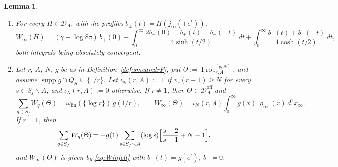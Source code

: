 \documentclass[11pt]{amsart}
\newtheorem{lemma}[theorem]{Lemma}
\theoremstyle{definition}
\newcommand{\Frob}{\operatorname{Frob}}
\newcommand{\supp}{\operatorname{supp}}
\newcommand{\DA}{\mathcal D_A}
\newcommand{\Doff}{\mathcal D_A^{\mathrm{off}}}
\begin{document}
\begin{lemma}\label{lem:boxtrace}
\begin{enumerate}
\item[(a)] For every $H\in\DA$, with the profiles
$b_\pm(t)=H(j_\infty(\pm e^t))$,
\begin{equation}\label{eq:Winfalt}
  W_\infty(H)=(\gamma+\log8\pi)\,b_+(0)
   -\int_0^\infty\frac{2b_+(0)-b_+(t)-b_+(-t)}{4\sinh(t/2)}\,dt
   +\int_0^\infty\frac{b_-(t)+b_-(-t)}{4\cosh(t/2)}\,dt ,
\end{equation}
both integrals being absolutely convergent.
\item[(b)] Let $r$, $A$, $N$, $g$ be as in
Definition~\ref{def:smearedrF}, put $\Theta:=\Frob_{r,A}^{[g,N]}$, and assume
$\supp g\cap Q_S\subseteq\{1/r\}$. Let $\iota_N(r,A):=1$ if $v_s(r-1)\ge N$
for every $s\in S_f\smallsetminus A$, and $\iota_N(r,A):=0$ otherwise. If
$r\ne1$, then $\Theta\in\Doff$ and
\begin{equation}\label{eq:boxoff}
  \sum_{q\in S_f}W_q(\Theta)=\omega_{\mathrm{fin}}(\{\log r\})\,g(1/r),\qquad
  W_\infty(\Theta)=\iota_N(r,A)\int_0^\infty g(x)\,\varrho_\infty(x)\,
    d^*x_\infty .
\end{equation}
If $r=1$, then
\begin{equation}\label{eq:unitpacket}
  \sum_{q\in S_f}W_q(\Theta)=-g(1)\sum_{s\in S_f\smallsetminus A}(\log s)
    \Bigl[\frac{s-2}{s-1}+N-1\Bigr],
\end{equation}
and $W_\infty(\Theta)$ is given by \eqref{eq:Winfalt} with $b_+(t)=g(e^t)$,
$b_-=0$.
\end{enumerate}
\end{lemma}
\end{document}
